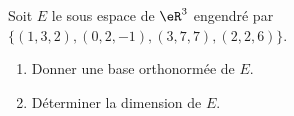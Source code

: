 

\begin{exercice}\label{exoMars20100004}

	Soit $E$ le sous espace de $\eR^3$ engendré par $\{ (1,3,2),(0,2,-1),(3,7,7),(2,2,6) \}$.
	\begin{enumerate}

		\item
			Donner une base orthonormée de $E$.
		\item
			Déterminer la dimension de $E$.

	\end{enumerate}

\end{exercice}
